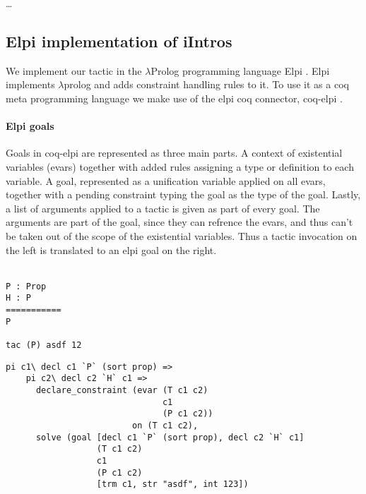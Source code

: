 \documentclass[thesis.tex]{subfiles}
\begin{document}
\dots

\subsection{Elpi implementation of iIntros}
We implement our tactic in the $\lambda$Prolog programming language Elpi \cite{dunchevELPIFastEmbeddable2015}. Elpi implements $\lambda$prolog and adds constraint handling rules to it. To use it as a coq meta programming language we make use of the elpi coq connector, coq-elpi \cite{tassiElpiExtensionLanguage2018}.

\paragraph*{Elpi goals}
Goals in coq-elpi are represented as three main parts. A context of existential variables (evars) together with added rules assigning a type or definition to each variable. A goal, represented as a unification variable applied on all evars, together with a pending constraint typing the goal as the type of the goal. Lastly, a list of arguments applied to a tactic is given as part of every goal. The arguments are part of the goal, since they can refrence the evars, and thus can't be taken out of the scope of the existential variables. Thus a tactic invocation on the left is translated to an elpi goal on the right.
\\\\
\begin{minipage}[t]{0.2\linewidth}
    \begin{verbatim}
P : Prop
H : P
===========
P

tac (P) asdf 12
\end{verbatim}
\end{minipage}
\begin{minipage}[t]{0.45\linewidth}
    \begin{verbatim}
pi c1\ decl c1 `P` (sort prop) =>
    pi c2\ decl c2 `H` c1 =>
      declare_constraint (evar (T c1 c2) 
                               c1
                               (P c1 c2)) 
                         on (T c1 c2),
      solve (goal [decl c1 `P` (sort prop), decl c2 `H` c1] 
                  (T c1 c2)
                  c1 
                  (P c1 c2)
                  [trm c1, str "asdf", int 123])
\end{verbatim}
    \vspace{.1cm}
\end{minipage}
\end{document}
